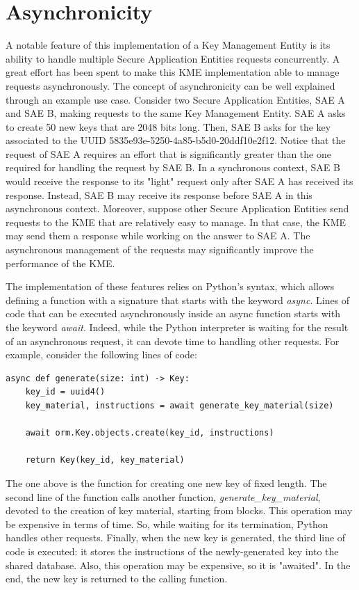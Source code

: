 \section{Asynchronicity}
A notable feature of this implementation of a Key Management Entity is its ability to handle multiple Secure Application Entities requests concurrently. A great effort has been spent to make this KME implementation able to manage requests asynchronously. The concept of asynchronicity can be well explained through an example use case. 
Consider two Secure Application Entities, SAE A and SAE B, making requests to the same Key Management Entity. SAE A asks to create 50 new keys that are 2048 bits long. Then, SAE B asks for the key associated to the UUID 5835e93e-5250-4a85-b5d0-20ddf10e2f12. Notice that the request of SAE A requires an effort that is significantly greater than the one required for handling the request by SAE B. In a synchronous context, SAE B would receive the response to its "light" request only after SAE A has received its response. Instead, SAE B may receive its response before SAE A in this asynchronous context.
Moreover, suppose other Secure Application Entities send requests to the KME that are relatively easy to manage. In that case, the KME may send them a response while working on the answer to SAE A. The asynchronous management of the requests may significantly improve the performance of the KME.

The implementation of these features relies on Python's syntax, which allows defining a function with a signature that starts with the keyword \textit{async}. Lines of code that can be executed asynchronously inside an async function starts with the keyword \textit{await}. Indeed, while the Python interpreter is waiting for the result of an asynchronous request, it can devote time to handling other requests. For example, consider the following lines of code:

\begin{verbatim}
async def generate(size: int) -> Key:
    key_id = uuid4()
    key_material, instructions = await generate_key_material(size)

    await orm.Key.objects.create(key_id, instructions)

    return Key(key_id, key_material)
\end{verbatim}

The one above is the function for creating one new key of fixed length. The second line of the function calls another function, \textit{generate\_key\_material}, devoted to the creation of key material, starting from blocks. This operation may be expensive in terms of time. So, while waiting for its termination, Python handles other requests. Finally, when the new key is generated, the third line of code is executed: it stores the instructions of the newly-generated key into the shared database. Also, this operation may be expensive, so it is "awaited". In the end, the new key is returned to the calling function.

